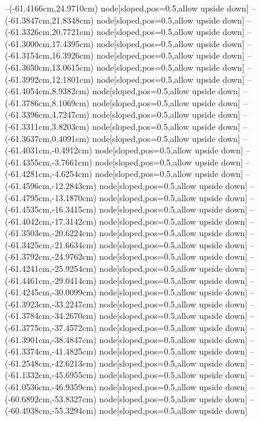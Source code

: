 --(-61.4166cm,24.9710cm) node[sloped,pos=0.5,allow upside down]{\arrowIn}
--(-61.3847cm,21.8348cm) node[sloped,pos=0.5,allow upside down]{\ArrowIn}
--(-61.3326cm,20.7721cm) node[sloped,pos=0.5,allow upside down]{\ArrowIn}
--(-61.3000cm,17.4395cm) node[sloped,pos=0.5,allow upside down]{\ArrowIn}
--(-61.3154cm,16.3926cm) node[sloped,pos=0.5,allow upside down]{\ArrowIn}
--(-61.3650cm,13.0615cm) node[sloped,pos=0.5,allow upside down]{\ArrowIn}
--(-61.3992cm,12.1801cm) node[sloped,pos=0.5,allow upside down]{\arrowIn}
--(-61.4054cm,8.9382cm) node[sloped,pos=0.5,allow upside down]{\ArrowIn}
--(-61.3786cm,8.1069cm) node[sloped,pos=0.5,allow upside down]{\arrowIn}
--(-61.3396cm,4.7247cm) node[sloped,pos=0.5,allow upside down]{\ArrowIn}
--(-61.3311cm,3.8203cm) node[sloped,pos=0.5,allow upside down]{\arrowIn}
--(-61.3637cm,0.4091cm) node[sloped,pos=0.5,allow upside down]{\ArrowIn}
--(-61.4031cm,-0.4912cm) node[sloped,pos=0.5,allow upside down]{\arrowIn}
--(-61.4355cm,-3.7661cm) node[sloped,pos=0.5,allow upside down]{\ArrowIn}
--(-61.4281cm,-4.6254cm) node[sloped,pos=0.5,allow upside down]{\arrowIn}
--(-61.4596cm,-12.2843cm) node[sloped,pos=0.5,allow upside down]{\ArrowIn}
--(-61.4795cm,-13.1870cm) node[sloped,pos=0.5,allow upside down]{\arrowIn}
--(-61.4535cm,-16.3415cm) node[sloped,pos=0.5,allow upside down]{\ArrowIn}
--(-61.4042cm,-17.3142cm) node[sloped,pos=0.5,allow upside down]{\arrowIn}
--(-61.3503cm,-20.6224cm) node[sloped,pos=0.5,allow upside down]{\ArrowIn}
--(-61.3425cm,-21.6634cm) node[sloped,pos=0.5,allow upside down]{\ArrowIn}
--(-61.3792cm,-24.9762cm) node[sloped,pos=0.5,allow upside down]{\ArrowIn}
--(-61.4241cm,-25.9254cm) node[sloped,pos=0.5,allow upside down]{\arrowIn}
--(-61.4461cm,-29.0414cm) node[sloped,pos=0.5,allow upside down]{\ArrowIn}
--(-61.4245cm,-30.0099cm) node[sloped,pos=0.5,allow upside down]{\arrowIn}
--(-61.3923cm,-33.2247cm) node[sloped,pos=0.5,allow upside down]{\ArrowIn}
--(-61.3784cm,-34.2670cm) node[sloped,pos=0.5,allow upside down]{\ArrowIn}
--(-61.3775cm,-37.4572cm) node[sloped,pos=0.5,allow upside down]{\ArrowIn}
--(-61.3901cm,-38.4847cm) node[sloped,pos=0.5,allow upside down]{\ArrowIn}
--(-61.3374cm,-41.4825cm) node[sloped,pos=0.5,allow upside down]{\ArrowIn}
--(-61.2548cm,-42.6213cm) node[sloped,pos=0.5,allow upside down]{\ArrowIn}
--(-61.1332cm,-45.6955cm) node[sloped,pos=0.5,allow upside down]{\ArrowIn}
--(-61.0536cm,-46.9359cm) node[sloped,pos=0.5,allow upside down]{\ArrowIn}
--(-60.6892cm,-53.8327cm) node[sloped,pos=0.5,allow upside down]{\ArrowIn}
--(-60.4938cm,-55.3294cm) node[sloped,pos=0.5,allow upside down]{\ArrowIn}

